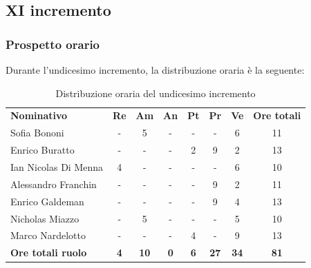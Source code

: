 \documentclass[../piano-di-progetto.tex]{subfiles}
\begin{document}
  \subsection{XI incremento}

  \subsubsection{Prospetto orario}
 Durante l'undicesimo incremento, la distribuzione oraria è la seguente:
  \begin{table}[H]
    \centering
    \begin{tabular}{lccccccc}
    \rowcolor{lightgray}
    \textbf{Nominativo}       & \textbf{Re} & \textbf{Am} & \textbf{An} & \textbf{Pt} & \textbf{Pr} & \textbf{Ve} & \textbf{Ore totali} \\
Sofia Bononi              & -          & 5           & -          & -          & -           & 6           & 11          \\
Enrico Buratto            & -          & -           & -          & 2          & 9           & 2           & 13          \\
Ian Nicolas Di Menna      & 4          & -           & -          & -          & -           & 6           & 10          \\
Alessandro Franchin       & -          & -           & -          & -          & 9           & 2           & 11          \\
Enrico Galdeman           & -          & -           & -          & -          & 9           & 4           & 13          \\
Nicholas Miazzo           & -          & 5           & -          & -          & -           & 5           & 10          \\
Marco Nardelotto          & -          & -           & -          & 4          & -           & 9           & 13          \\
\textbf{Ore totali ruolo} & \textbf{4} & \textbf{10} & \textbf{0} & \textbf{6} & \textbf{27} & \textbf{34} & \textbf{81}
    
    \end{tabular}
    \caption{Distribuzione oraria del undicesimo incremento}
  \end{table}
\end{document}
